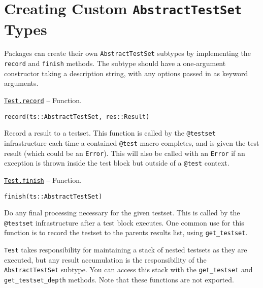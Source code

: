 \hypertarget{2880149133289869510}{}


\section{Creating Custom \texttt{AbstractTestSet} Types}



Packages can create their own \texttt{AbstractTestSet} subtypes by implementing the \texttt{record} and \texttt{finish} methods. The subtype should have a one-argument constructor taking a description string, with any options passed in as keyword arguments.


\hypertarget{5358474705981864018}{} 
\hyperlink{5358474705981864018}{\texttt{Test.record}}  -- {Function.}

\begin{adjustwidth}{2em}{0pt}


\begin{verbatim}
record(ts::AbstractTestSet, res::Result)
\end{verbatim}

Record a result to a testset. This function is called by the \texttt{@testset} infrastructure each time a contained \texttt{@test} macro completes, and is given the test result (which could be an \texttt{Error}). This will also be called with an \texttt{Error} if an exception is thrown inside the test block but outside of a \texttt{@test} context.



\end{adjustwidth}
\hypertarget{3045207246411142824}{} 
\hyperlink{3045207246411142824}{\texttt{Test.finish}}  -- {Function.}

\begin{adjustwidth}{2em}{0pt}


\begin{verbatim}
finish(ts::AbstractTestSet)
\end{verbatim}

Do any final processing necessary for the given testset. This is called by the \texttt{@testset} infrastructure after a test block executes. One common use for this function is to record the testset to the parent{\textquotesingle}s results list, using \texttt{get\_testset}.



\end{adjustwidth}

\texttt{Test} takes responsibility for maintaining a stack of nested testsets as they are executed, but any result accumulation is the responsibility of the \texttt{AbstractTestSet} subtype. You can access this stack with the \texttt{get\_testset} and \texttt{get\_testset\_depth} methods. Note that these functions are not exported.


